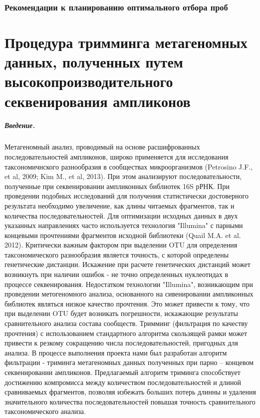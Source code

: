 \documentclass[a4paper,12pt,openany,final]{extreport}
\begin{document}
\subsection{Рекомендации к планированию оптимального отбора проб}

\chapter{Процедура тримминга метагеномных данных, полученных
путем высокопроизводительного секвенирования ампликонов}

\paragraph{Введение.} Метагеномный анализ, проводимый на основе
расшифрованных последовательностей ампликонов, широко применяется для
исследования таксономичнского разнообразия в сообществах микроорганизмов
(Petrosino J.F., et al, 2009; Kim M., et al, 2013). При этом анализируют
последовательности, полученные при секвенировании ампликонных библиотек
16S рРНК. При проведении подобных исследований для получения
статистически достоверного результата необходимо увеличение, как длины
читаемых фрагментов, так и количества последовательностей. Для
оптимизации исходных данных в двух указанных направлениях часто
используется технология "Illumina" с парными концевыми прочтениями
фрагментов исходной библиотеки (Quail M.A. et al. 2012). Критически
важным фактором при выделении OTU для определения таксономического
разнообразия является точность, с которой определены генетические
дистанции. Искажение при расчете генетических дистанций может возникнуть
при наличии ошибок - не точно определенных нуклеотидах в процессе
секвенирования. Недостатком технологии "Illumina", возникающим при
проведении метогеномного анализа, основанного на сивенировании
ампликонных библиотек являться низкое качество прочтения. Это может
привести к тому, что при выделении OTU будет возникать погрешности,
искажающие результаты сравнительного анализа состава сообществ. Тримминг
(фильтрация по качеству прочтения) с использованием стандартного
алгоритма скользящей рамки может привести к резкому сокращению числа
последовательностей, пригодных для анализа. В процессе выполнения
проекта нами был разработан алгоритм фильтрации - триминга метагеномных
данных полученных при парно -- концевом секвенировании ампликонов.
Предлагаемый алгоритм триминга способствует достижению компромисса между
количеством последовательностей и длиной сравниваемых фрагментов,
позволяя избежать больших потерь длинны и удаления значительного
количества последовательностей повышая точность сравнительного
таксономического анализа.
\end{document}
